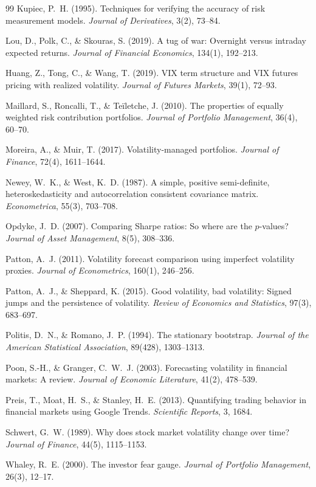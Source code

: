 \documentclass[12pt,a4paper]{article}
\begin{document}
\begin{thebibliography}{99}
Kupiec, P.~H. (1995). Techniques for verifying the accuracy of risk measurement models. \textit{Journal of Derivatives}, 3(2), 73--84.

Lou, D., Polk, C., \& Skouras, S. (2019). A tug of war: Overnight versus intraday expected returns. \textit{Journal of Financial Economics}, 134(1), 192--213.

Huang, Z., Tong, C., \& Wang, T. (2019). VIX term structure and VIX futures pricing with realized volatility. \textit{Journal of Futures Markets}, 39(1), 72--93.

Maillard, S., Roncalli, T., \& Te\"{i}letche, J. (2010). The properties of equally weighted risk contribution portfolios. \textit{Journal of Portfolio Management}, 36(4), 60--70.

Moreira, A., \& Muir, T. (2017). Volatility-managed portfolios. \textit{Journal of Finance}, 72(4), 1611--1644.

Newey, W.~K., \& West, K.~D. (1987). A simple, positive semi-definite, heteroskedasticity and autocorrelation consistent covariance matrix. \textit{Econometrica}, 55(3), 703--708.

Opdyke, J.~D. (2007). Comparing Sharpe ratios: So where are the $p$-values? \textit{Journal of Asset Management}, 8(5), 308--336.

Patton, A.~J. (2011). Volatility forecast comparison using imperfect volatility proxies. \textit{Journal of Econometrics}, 160(1), 246--256.

Patton, A.~J., \& Sheppard, K. (2015). Good volatility, bad volatility: Signed jumps and the persistence of volatility. \textit{Review of Economics and Statistics}, 97(3), 683--697.

Politis, D.~N., \& Romano, J.~P. (1994). The stationary bootstrap. \textit{Journal of the American Statistical Association}, 89(428), 1303--1313.

Poon, S.-H., \& Granger, C.~W.~J. (2003). Forecasting volatility in financial markets: A review. \textit{Journal of Economic Literature}, 41(2), 478--539.

Preis, T., Moat, H.~S., \& Stanley, H.~E. (2013). Quantifying trading behavior in financial markets using Google Trends. \textit{Scientific Reports}, 3, 1684.

Schwert, G.~W. (1989). Why does stock market volatility change over time? \textit{Journal of Finance}, 44(5), 1115--1153.

Whaley, R.~E. (2000). The investor fear gauge. \textit{Journal of Portfolio Management}, 26(3), 12--17.

\end{thebibliography}
\end{document}
